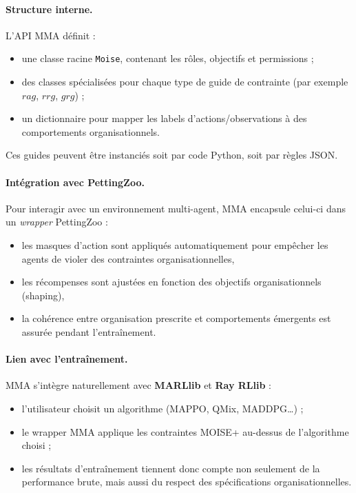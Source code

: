 \paragraph{Structure interne.}
L’API MMA définit :
\begin{itemize}
  \item une classe racine \texttt{Moise}, contenant les rôles, objectifs et permissions ;
  \item des classes spécialisées pour chaque type de guide de contrainte (par exemple $rag$, $rrg$, $grg$) ;
  \item un dictionnaire pour mapper les labels d’actions/observations à des comportements organisationnels.
\end{itemize}
Ces guides peuvent être instanciés soit par code Python, soit par règles JSON.

\paragraph{Intégration avec PettingZoo.}
Pour interagir avec un environnement multi-agent, MMA encapsule celui-ci dans un \textit{wrapper} PettingZoo :
\begin{itemize}
  \item les masques d’action sont appliqués automatiquement pour empêcher les agents de violer des contraintes organisationnelles,
  \item les récompenses sont ajustées en fonction des objectifs organisationnels (shaping),
  \item la cohérence entre organisation prescrite et comportements émergents est assurée pendant l’entraînement.
\end{itemize}

\paragraph{Lien avec l’entraînement.}
MMA s’intègre naturellement avec \textbf{MARLlib} et \textbf{Ray RLlib} :
\begin{itemize}
  \item l’utilisateur choisit un algorithme (MAPPO, QMix, MADDPG…) ;
  \item le wrapper MMA applique les contraintes MOISE+ au-dessus de l’algorithme choisi ;
  \item les résultats d’entraînement tiennent donc compte non seulement de la performance brute, mais aussi du respect des spécifications organisationnelles.
\end{itemize}

